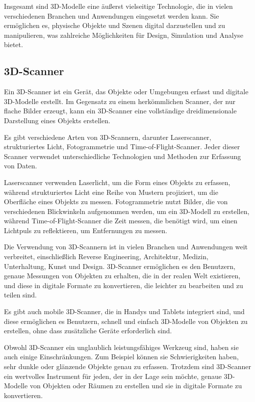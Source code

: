 Insgesamt sind 3D-Modelle eine äußerst vielseitige Technologie, die in vielen verschiedenen Branchen und Anwendungen eingesetzt werden kann. Sie ermöglichen es, physische Objekte und Szenen digital darzustellen und zu manipulieren, was zahlreiche Möglichkeiten für Design, Simulation und Analyse bietet.

\subsection{3D-Scanner}
Ein 3D-Scanner ist ein Gerät, das Objekte oder Umgebungen erfasst und digitale 3D-Modelle erstellt. Im Gegensatz zu einem herkömmlichen Scanner, der nur flache Bilder erzeugt, kann ein 3D-Scanner eine vollständige dreidimensionale Darstellung eines Objekts erstellen.

Es gibt verschiedene Arten von 3D-Scannern, darunter Laserscanner, strukturiertes Licht, Fotogrammetrie und Time-of-Flight-Scanner. Jeder dieser Scanner verwendet unterschiedliche Technologien und Methoden zur Erfassung von Daten.

Laserscanner verwenden Laserlicht, um die Form eines Objekts zu erfassen, während strukturiertes Licht eine Reihe von Mustern projiziert, um die Oberfläche eines Objekts zu messen. Fotogrammetrie nutzt Bilder, die von verschiedenen Blickwinkeln aufgenommen werden, um ein 3D-Modell zu erstellen, während Time-of-Flight-Scanner die Zeit messen, die benötigt wird, um einen Lichtpuls zu reflektieren, um Entfernungen zu messen.

Die Verwendung von 3D-Scannern ist in vielen Branchen und Anwendungen weit verbreitet, einschließlich Reverse Engineering, Architektur, Medizin, Unterhaltung, Kunst und Design. 3D-Scanner ermöglichen es den Benutzern, genaue Messungen von Objekten zu erhalten, die in der realen Welt existieren, und diese in digitale Formate zu konvertieren, die leichter zu bearbeiten und zu teilen sind.

Es gibt auch mobile 3D-Scanner, die in Handys und Tablets integriert sind, und diese ermöglichen es Benutzern, schnell und einfach 3D-Modelle von Objekten zu erstellen, ohne dass zusätzliche Geräte erforderlich sind.

Obwohl 3D-Scanner ein unglaublich leistungsfähiges Werkzeug sind, haben sie auch einige Einschränkungen. Zum Beispiel können sie Schwierigkeiten haben, sehr dunkle oder glänzende Objekte genau zu erfassen. Trotzdem sind 3D-Scanner ein wertvolles Instrument für jeden, der in der Lage sein möchte, genaue 3D-Modelle von Objekten oder Räumen zu erstellen und sie in digitale Formate zu konvertieren.

